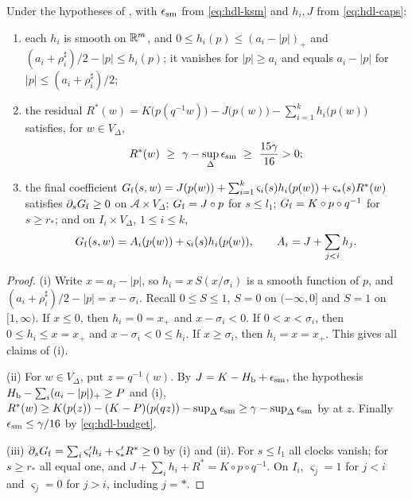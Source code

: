 \begin{proposition}[Layers]\label{prop:hdl-layers}
Under the hypotheses of , with $\epsilon_{\rm sm}$ from \eqref{eq:hdl-ksm} and $h_i,J$ from \eqref{eq:hdl-caps}:
\begin{enumerate}[label=(\roman*)]
\item each $h_i$ is smooth on $\mathbb{R}^m$, and
$0\le h_i(p)\le(a_i-|p|)_+$ and $(a_i+\rho_i^\sharp)/2-|p|\le h_i(p)$;
it vanishes for $|p|\ge a_i$ and equals $a_i-|p|$ for $|p|\le(a_i+\rho_i^\sharp)/2$;
\item the residual $R^*(w)=K\big(p(q^{-1}w)\big)-J\big(p(w)\big)-\sum_{i=1}^kh_i\big(p(w)\big)$ satisfies, for $w\in V_\Delta$,
\[
 R^*(w)\ \ge\ \gamma-\sup_\Delta\epsilon_{\rm sm}\ \ge\ \frac{15\gamma}{16}>0 ;
\]
\item the final coefficient
$G_{\rm f}(s,w)=J(p(w))+\sum_{i=1}^k\varsigma_i(s)h_i(p(w))+\varsigma_*(s)R^*(w)$ satisfies  $\partial_sG_{\rm f}\ge0$ on
$\mathcal A\times V_\Delta$; $G_{\rm f}=J\circ p$ for $s\le l_1$; $G_{\rm f}=K\circ p\circ q^{-1}$ for
$s\ge r_*$; and on $I_i\times V_\Delta$, $1\le i\le k$,
\[
 G_{\rm f}(s,w)=A_i(p(w))+\varsigma_i(s)h_i(p(w)),\qquad A_i=J+\sum_{j<i}h_j .
\]
\end{enumerate}
\end{proposition}

\begin{proof}
(i) Write $x=a_i-|p|$, so $h_i=x\,S(x/\sigma_i)$ is a smooth function of $p$, and $(a_i+\rho_i^\sharp)/2-|p|=x-\sigma_i$. Recall
$0\le S\le1$, $S=0$ on $(-\infty,0]$ and $S=1$ on $[1,\infty)$. If $x\le0$, then $h_i=0=x_+$ and $x-\sigma_i<0$. If
$0<x<\sigma_i$, then $0\le h_i\le x=x_+$ and $x-\sigma_i<0\le h_i$. If $x\ge\sigma_i$, then $h_i=x=x_+$. This gives all
claims of (i).

(ii) For $w\in V_\Delta$, put $z=q^{-1}(w)$. By $J=K-H_{\mathrm b}+\epsilon_{\rm sm}$, the hypothesis $H_{\mathrm b}-\sum_i(a_i-|p|)_+\ge P$ and (i), $R^*(w)\ge K(p(z))-(K-P)(p(qz))-\sup_\Delta\epsilon_{\rm sm}\ge\gamma-\sup_\Delta\epsilon_{\rm sm}$ by  at $z$. Finally $\epsilon_{\rm sm}\le\gamma/16$ by \eqref{eq:hdl-budget}.

(iii) $\partial_sG_{\rm f}=\sum_i\varsigma_i'h_i+\varsigma_*'R^*\ge0$ by (i) and (ii). For $s\le l_1$ all clocks vanish; for $s\ge r_*$ all equal one, and $J+\sum_ih_i+R^*=K\circ p\circ q^{-1}$. On $I_i$, $\varsigma_j=1$ for $j<i$ and $\varsigma_j=0$ for $j>i$, including $j=*$.
\end{proof}


